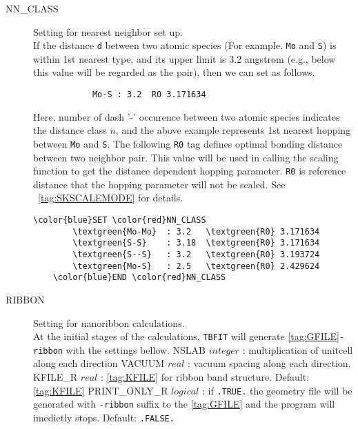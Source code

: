 \documentclass[a4paper,12pt]{scrartcl}
\makeatletter
\def\namedlabel#1#2{\begingroup
    #2%
    \def\@currentlabel{#2}%
    \phantomsection\label{#1}\endgroup
}
\newcommand{\tbfitname}{\textcolor{blue!85!white}{\texttt{TBFIT}}}
\newcommand{\textgreen}[1]{\textcolor{green!50!black}{\texttt{#1}}}
\makeatother
\begin{document}
\begin{description}
 	\item[\namedlabel{tag:NNCLASS}{NN\_CLASS}] 
		Setting for nearest neighbor set up. \\
		If the distance \texttt{d} between two atomic species (For example, \texttt{Mo} 
		and \texttt{S}) is within 1st nearest type, and its upper limit is 3.2 
		angstrom (e.g., below this value will be regarded as the pair), then
		we can set as follows,
        \begin{verbatim}
         	Mo-S : 3.2  R0 3.171634
        \end{verbatim}  

		Here, number of dash '-' occurence between two atomic species indicates 
		the distance class $n$, and the above example represents 1st nearest 
		hopping between \texttt{Mo} and \texttt{S}. The following \texttt{R0} 
		tag defines optimal bonding distance between two neighbor pair. 
		This value will be used in calling the scaling function to get 
		the distance dependent hopping parameter. \texttt{R0} is reference distance that the hopping parameter will not be scaled. See ~\ref{tag:SKSCALEMODE} for details.

 \begin{Verbatim}[commandchars=\\\{\},gobble=4, frame=single, framesep=2mm, 
    label= NN\_CLASS setup example,
    labelposition=bottomline]
    \color{blue}SET \color{red}NN_CLASS
        \textgreen{Mo-Mo}  : 3.2   \textgreen{R0} 3.171634
        \textgreen{S-S}    : 3.18  \textgreen{R0} 3.171634  
        \textgreen{S--S}   : 3.2   \textgreen{R0} 3.193724  
        \textgreen{Mo-S}   : 2.5   \textgreen{R0} 2.429624  
    \color{blue}END \color{red}NN_CLASS
 \end{Verbatim}


 	\item[\namedlabel{tag:RIBBON}{RIBBON}] 
		Setting for nanoribbon calculations. \\
		At the initial stages of the calculations, \tbfitname{} will generate
		\ref{tag:GFILE}\texttt{-ribbon} with the settings bellow.
		\subitem NSLAB $integer$ : multiplication of unitcell along each direction 
		\subitem VACUUM  $real$  : vacuum spacing along each direction.  
		\subitem KFILE\_R $real$  : \ref{tag:KFILE} for ribbon band structure. 
			Default: \ref{tag:KFILE}
		\subitem PRINT\_ONLY\_R $logical$  : if \texttt{.TRUE.} the geometry 
		file will be generated with \texttt{-ribbon} suffix to the \ref{tag:GFILE}
		and the program will imedietly stops. Default: \texttt{.FALSE.}
		

\end{description}
\end{document}
